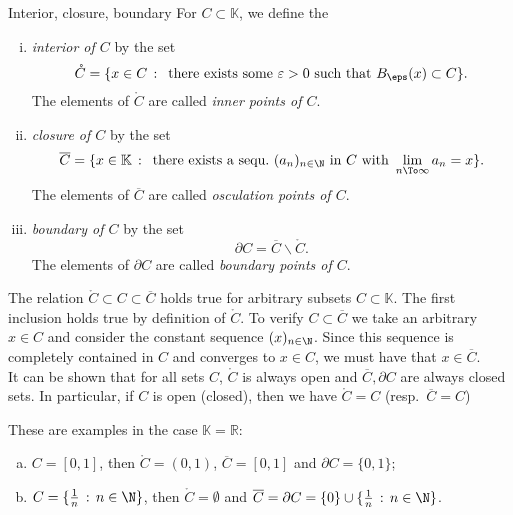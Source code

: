 
\begin{Definition}{Interior{,} closure{,} boundary}
For $C\subset \mathbb{K}$, we define the
\begin{enumerate}[(i)]
 \item \textit{interior of $C$} by the set
\[\mathring{C}=\{x\in C\,:\,\text{ there exists some }\varepsilon>0\text{ such that }B_{\eps}(x)\subset C\}.\]
The elements of $\mathring{C}$ are called \textit{inner points of $C$}.
 \item \textit{closure of $C$} by the set
\[\overline{C}=\{x\in \mathbb{K}\,:\,\text{ there exists a~sequ.\ }(a_n)_{n\in\N}\text{ in $C$ with }\lim_{n\To\infty}a_{n}=x\}.\]
The elements of $\overline{C}$ are called \textit{osculation points of $C$}.
 \item \textit{boundary of $C$} by the set
\[\partial C=\overline{C}\backslash \mathring{C}.\]
The elements of $\partial{C}$ are called \textit{boundary points of $C$}.
\end{enumerate}
\end{Definition}
\begin{Remark}{}
The relation $\mathring{C}\subset C\subset \overline{C}$ holds true for arbitrary subsets $C\subset \mathbb{K}$. The first inclusion holds true by definition of $\mathring{C}$. To verify $C\subset \overline{C}$ we take an arbitrary $x\in C$ and consider the constant sequence $(x)_{n\in\N}$. Since this sequence is completely contained in $C$ and converges to $x\in C$, we must have that $x\in\overline{C}$.\\
It can be shown that for all sets $C$, $\mathring{C}$ is always open and $\overline{C}, \partial C$ are always closed sets. In particular, if $C$ is open (closed), then we have $\mathring{C}=C$ (resp.\ $\overline{C}=C$)
\end{Remark}

\begin{example}
These are examples in the case $\mathbb{K} = \mathbb{R}$:
\begin{enumerate}[(a)]
 \item $C=[0,1]$, then $\mathring{C}=(0,1)$, $\overline{C}=[0,1]$ and $\partial C=\{0,1\}$;
 \item $C=\{\frac1n\,:\,n\in\N\}$, then $\mathring{C}=\emptyset$ and $\overline{C}=\partial C=\{0\}\cup \{\frac1n\,:\,n\in\N\}$.
\end{enumerate}
\end{example}
